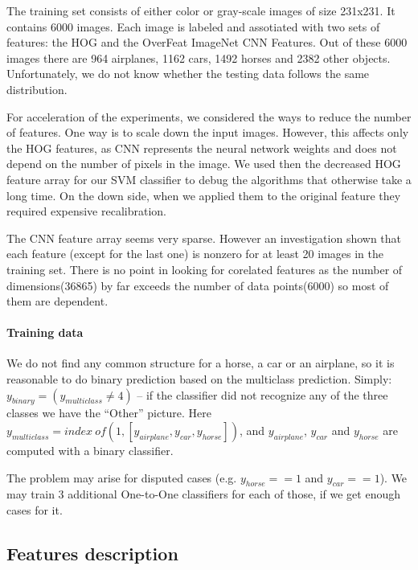 \documentclass{article} %
\begin{document}
The training set consists of either color or gray-scale images of size 231x231. It contains 6000 images. Each image is labeled and assotiated with two sets of features: the HOG and the OverFeat ImageNet CNN Features.
Out of these 6000 images there are 964 airplanes, 1162 cars, 1492 horses and 2382 other objects.
Unfortunately, we do not know whether the testing data follows the same distribution.

For acceleration of the experiments, we considered the ways to reduce the number of features. 
One way is to scale down the input images. However, this affects only the HOG features, as CNN represents the neural network weights and does not depend on the number of pixels in the image. We used then the decreased HOG feature array for our SVM classifier to debug the algorithms that otherwise take a long time. On the down side, when we applied them to the original feature they required expensive recalibration.

The CNN feature array seems very sparse. However an investigation shown that each feature (except for the last one) is nonzero for at least 20 images in the training set. There is no point in looking for corelated features as the number of dimensions(36865) by far exceeds the number of data points(6000) so most of them are dependent.

\paragraph{Training data}

We do not find any common structure for a horse, a car or an airplane, so it is reasonable to do binary prediction based on the multiclass prediction. Simply:
$y_{binary} = (y_{multiclass} \neq 4)$  -- if the classifier did not recognize any of the three classes we have the ``Other'' picture. Here $y_{multiclass} = index\ of(1, [y_{airplane}, y_{car}, y_{horse}])$, and $y_{airplane}$, $y_{car}$ and $y_{horse}$ are computed with a binary classifier.

The problem may arise for disputed cases (e.g. $y_{horse} == 1$ and $y_{car} == 1$). We may train 3 additional One-to-One classifiers for each of those, if we get enough cases for it.

\subsection{Features description}
\end{document}
